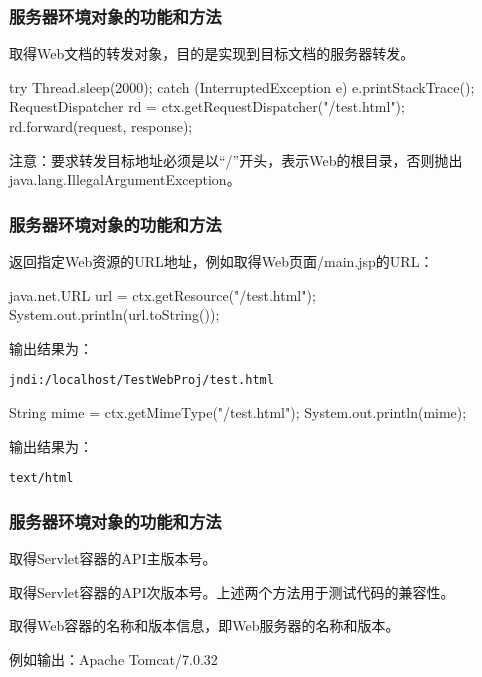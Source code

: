 \begin{frame}[fragile] %
\frametitle{服务器环境对象的功能和方法} 


取得Web文档的转发对象，目的是实现到目标文档的服务器转发。

\begin{javaCode}
try {
  Thread.sleep(2000);
} catch (InterruptedException e) {
  e.printStackTrace();
}
RequestDispatcher rd = ctx.getRequestDispatcher("/test.html");
rd.forward(request, response);  
\end{javaCode}

注意：要求转发目标地址必须是以“/”开头，表示Web的根目录，否则抛出java.lang.IllegalArgumentException。
\end{frame}

\begin{frame} %
\frametitle{服务器环境对象的功能和方法} 


返回指定Web资源的URL地址，例如取得Web页面/main.jsp的URL：
\begin{javaCode}
java.net.URL url = ctx.getResource("/test.html");
System.out.println(url.toString());  
\end{javaCode}

输出结果为：
\begin{verbatim}
jndi:/localhost/TestWebProj/test.html
\end{verbatim}


\begin{javaCode}
String mime = ctx.getMimeType("/test.html");
System.out.println(mime);  
\end{javaCode}

输出结果为：

\begin{verbatim}
text/html
\end{verbatim}
\end{frame}

\begin{frame}[fragile] %
\frametitle{服务器环境对象的功能和方法} 



取得Servlet容器的API主版本号。


取得Servlet容器的API次版本号。上述两个方法用于测试代码的兼容性。


取得Web容器的名称和版本信息，即Web服务器的名称和版本。

例如输出：Apache Tomcat/7.0.32
\end{frame}

